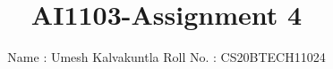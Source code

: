 \documentclass[journal,12pt,twocolumn]{IEEEtran}
\DeclareMathOperator*{\Res}{Res}
\begin{document}
\newcommand{\BEQA}{\begin{eqnarray}}
\newcommand{\EEQA}{\end{eqnarray}}
\newcommand{\define}{\stackrel{\triangle}{=}}

\raggedbottom
\setlength{\parindent}{0pt}
\providecommand{\mbf}{\mathbf}
\providecommand{\pr}[1]{\ensuremath{\Pr\left(#1\right)}}
\providecommand{\qfunc}[1]{\ensuremath{Q\left(#1\right)}}
\providecommand{\sbrak}[1]{\ensuremath{{}\left[#1\right]}}
\providecommand{\lsbrak}[1]{\ensuremath{{}\left[#1\right.}}
\providecommand{\rsbrak}[1]{\ensuremath{{}\left.#1\right]}}
\providecommand{\brak}[1]{\ensuremath{\left(#1\right)}}
\providecommand{\lbrak}[1]{\ensuremath{\left(#1\right.}}
\providecommand{\rbrak}[1]{\ensuremath{\left.#1\right)}}
\providecommand{\cbrak}[1]{\ensuremath{\left\{#1\right\}}}
\providecommand{\lcbrak}[1]{\ensuremath{\left\{#1\right.}}
\providecommand{\rcbrak}[1]{\ensuremath{\left.#1\right\}}}
\theoremstyle{remark}
\newtheorem{rem}{Remark}
\newcommand{\sgn}{\mathop{\mathrm{sgn}}}
\providecommand{\abs}[1]{\vert#1\vert}
\providecommand{\res}[1]{\Res\displaylimits_{#1}} 
\providecommand{\norm}[1]{\lVert#1\rVert}
\providecommand{\mtx}[1]{\mathbf{#1}}
\providecommand{\mean}[1]{E[ #1 ]}
\providecommand{\fourier}{\overset{\mathcal{F}}{ \rightleftharpoons}}
\providecommand{\system}{\overset{\mathcal{H}}{ \longleftrightarrow}}
\newcommand{\solution}{\noindent \textbf{Solution: }}
\newcommand{\cosec}{\,\text{cosec}\,}
\providecommand{\dec}[2]{\ensuremath{\overset{#1}{\underset{#2}{\gtrless}}}}
\newcommand{\myvec}[1]{\ensuremath{\begin{pmatrix}#1\end{pmatrix}}}
\newcommand{\mydet}[1]{\ensuremath{\begin{vmatrix}#1\end{vmatrix}}}
\makeatletter
{}
\makeatother
\let\StandardTheFigure\thefigure
\let\vec\mathbf
\renewcommand{\thefigure}{\theproblem}
\def\putbox#1#2#3{\makebox[0in][l]{\makebox[#1][l]{}\raisebox{\baselineskip}[0in][0in]{\raisebox{#2}[0in][0in]{#3}}}}
     \def\rightbox#1{\makebox[0in][r]{#1}}
     \def\centbox#1{\makebox[0in]{#1}}
     \def\topbox#1{\raisebox{-\baselineskip}[0in][0in]{#1}}
     \def\midbox#1{\raisebox{-0.5\baselineskip}[0in][0in]{#1}}
\vspace{3cm}
\title{AI1103-Assignment 4}
\author{Name : Umesh Kalvakuntla     Roll No. : CS20BTECH11024}
\maketitle
\newpage
\bigskip
\renewcommand{\thefigure}{\theenumi}
\renewcommand{\thetable}{\theenumi}
\end{document}
